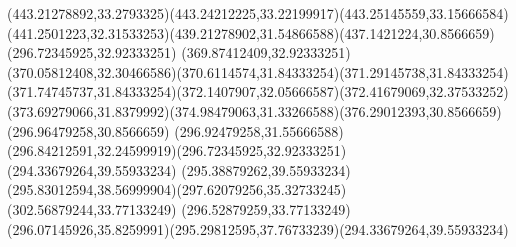{{	\curveto(443.21278892,33.2793325)(443.24212225,33.22199917)(443.25145559,33.15666584)
	\curveto(441.2501223,32.31533253)(439.21278902,31.54866588)(437.1421224,30.8566659)
	\closepath
	\moveto(296.72345925,32.92333251)
	\lineto(369.87412409,32.92333251)
	\curveto(370.05812408,32.30466586)(370.6114574,31.84333254)(371.29145738,31.84333254)
	\curveto(371.74745737,31.84333254)(372.1407907,32.05666587)(372.41679069,32.37533252)
	\curveto(373.69279066,31.8379992)(374.98479063,31.33266588)(376.29012393,30.8566659)
	\lineto(296.96479258,30.8566659)
	\curveto(296.92479258,31.55666588)(296.84212591,32.24599919)(296.72345925,32.92333251)
	\moveto(294.33679264,39.55933234)
	\lineto(295.38879262,39.55933234)
	\curveto(295.83012594,38.56999904)(297.62079256,35.32733245)(302.56879244,33.77133249)
	\lineto(296.52879259,33.77133249)
	\curveto(296.07145926,35.8259991)(295.29812595,37.76733239)(294.33679264,39.55933234)
}
}
{
}
{
}
